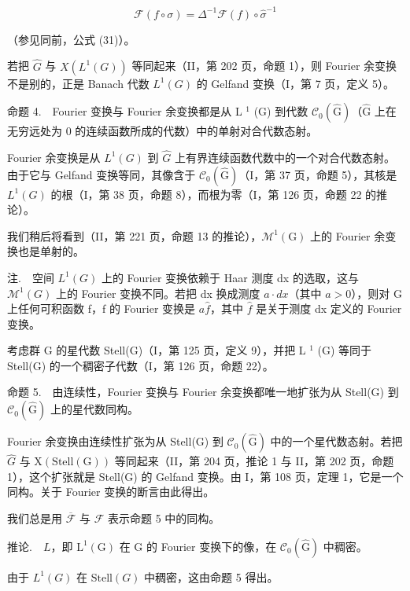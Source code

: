 \[
\mathcal {F} (f \circ \sigma) = \Delta^ {- 1} \mathcal {F} (f) \circ \widehat {\sigma} ^ {- 1}\tag{16}
\]

（参见同前，公式 (31)）。

若把 \(\widehat{G}\) 与 \(X(L^{1}(G))\) 等同起来（II，第 202 页，命题 1），则 Fourier 余变换不是别的，正是 Banach 代数 \(L^{1}(G)\) 的 Gelfand 变换（I，第 7 页，定义 5）。

命题 4.　Fourier 变换与 Fourier 余变换都是从 L \(^{1}\) (G) 到代数 \(\mathcal{C}_{0}(\widehat{\mathrm{G}})\)（\(\widehat{\mathrm{G}}\) 上在无穷远处为 0 的连续函数所成的代数）中的单射对合代数态射。

Fourier 余变换是从 \(L^{1}(G)\) 到 \(\widehat{G}\) 上有界连续函数代数中的一个对合代数态射。由于它与 Gelfand 变换等同，其像含于 \(\mathcal{C}_{0}(\widehat{\mathrm{G}})\)（I，第 37 页，命题 5），其核是 \(L^{1}(G)\) 的根（I，第 38 页，命题 8），而根为零（I，第 126 页，命题 22 的推论）。

我们稍后将看到（II，第 221 页，命题 13 的推论），\(\mathcal{M}^{1}(\mathrm{G})\) 上的 Fourier 余变换也是单射的。

注.　空间 \(L^{1}(G)\) 上的 Fourier 变换依赖于 Haar 测度 dx 的选取，这与 \(\mathcal{M}^{1}(G)\) 上的 Fourier 变换不同。若把 dx 换成测度 \(a \cdot dx\)（其中 \(a > 0\)），则对 G 上任何可积函数 f，f 的 Fourier 变换是 \(a\widehat{f}\)，其中 \(\widehat{f}\) 是关于测度 dx 定义的 Fourier 变换。

考虑群 G 的星代数 Stell(G)（I，第 125 页，定义 9），并把 L \(^{1}\) (G) 等同于 Stell(G) 的一个稠密子代数（I，第 126 页，命题 22）。

命题 5.　由连续性，Fourier 变换与 Fourier 余变换都唯一地扩张为从 Stell(G) 到 \(\mathcal{C}_{0}(\widehat{\mathrm{G}})\) 上的星代数同构。

Fourier 余变换由连续性扩张为从 Stell(G) 到 \(\mathcal{C}_{0}(\widehat{\mathrm{G}})\) 中的一个星代数态射。若把 \(\widehat{G}\) 与 \(\mathrm{X}(\mathrm{Stell}(\mathrm{G}))\) 等同起来（II，第 204 页，推论 1 与 II，第 202 页，命题 1），这个扩张就是 Stell(G) 的 Gelfand 变换。由 I，第 108 页，定理 1，它是一个同构。关于 Fourier 变换的断言由此得出。

我们总是用 \(\overline{\mathcal{F}}\) 与 \(\mathcal{F}\) 表示命题 5 中的同构。

推论.　\(L\)，即 \(\mathrm{L}^{1}(\mathrm{G})\) 在 G 的 Fourier 变换下的像，在 \(\mathcal{C}_{0}(\widehat{\mathrm{G}})\) 中稠密。

由于 \(L^{1}(G)\) 在 \(\text{Stell}(G)\) 中稠密，这由命题 5 得出。

